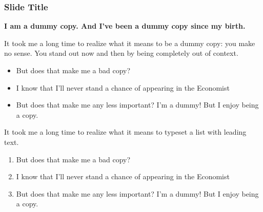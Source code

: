 \documentclass[
 UKenglish%
 ]{beamer}%
\begin{document}
\begin{frame}[c]
  \frametitle{Slide Title}
  \advance{}\hsize\RaggedRight
  {\color{KITgreen}\bfseries\Large I am a dummy copy. And I’ve been a dummy copy since my birth.\par}

  \bigskip\large
  It took me a long time to realize what it means to be a dummy copy: you make no
  sense. You stand out now and then by being completely out of context.
  
  \begin{itemize}
  \item But does that make me a bad copy?
  \item I know that I’ll never stand a chance of appearing in the Economist
  \item But does that make me any less important? I’m a dummy! But I enjoy being a copy.
  \end{itemize}

  It took me a long time to realize what it means to typeset a list with leading text.
  \begin{enumerate}
  \item But does that make me a bad copy?
  \item I know that I’ll never stand a chance of appearing in the Economist
  \item But does that make me any less important? I’m a dummy! But I enjoy being a copy.
  \end{enumerate}
\end{frame}
\end{document}

